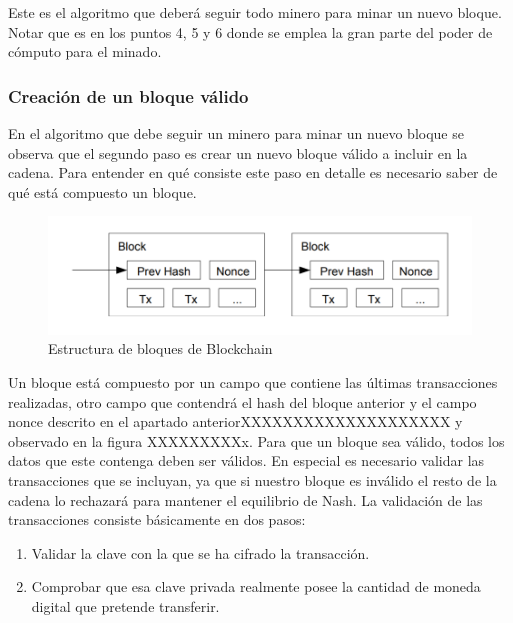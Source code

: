 Este es el algoritmo que deberá seguir todo minero para minar un nuevo bloque. Notar que es en los puntos 4, 5 y 6 donde se emplea la gran parte del poder de cómputo para el minado.

\subsubsection{Creación de un bloque válido}
En el algoritmo que debe seguir un minero para minar un nuevo bloque se observa que el segundo paso es crear un nuevo bloque válido a incluir en la cadena. Para entender en qué consiste este paso en detalle es necesario saber de qué está compuesto un bloque. 

\begin{figure}
	\centering
	\includegraphics[width=1\textwidth]{imagenes/bloque.PNG}
	\caption{\label{fig1}Estructura de bloques de Blockchain \cite{bitcoin}}
\end{figure}

Un bloque está compuesto por un campo que contiene las últimas transacciones realizadas, otro campo que contendrá el hash del bloque anterior y el campo nonce descrito en el apartado anteriorXXXXXXXXXXXXXXXXXXXX y observado en la figura XXXXXXXXXx. Para que un bloque sea válido, todos los datos que este contenga deben ser válidos. En especial es necesario validar las transacciones que se incluyan, ya que si nuestro bloque es inválido el resto de la cadena lo rechazará para mantener el equilibrio de Nash.
La validación de las transacciones consiste básicamente en dos pasos:

\begin{enumerate}
	\item Validar la clave con la que se ha cifrado la transacción.
	\item Comprobar que esa clave privada realmente posee la cantidad de moneda digital que pretende transferir.
\end{enumerate}

